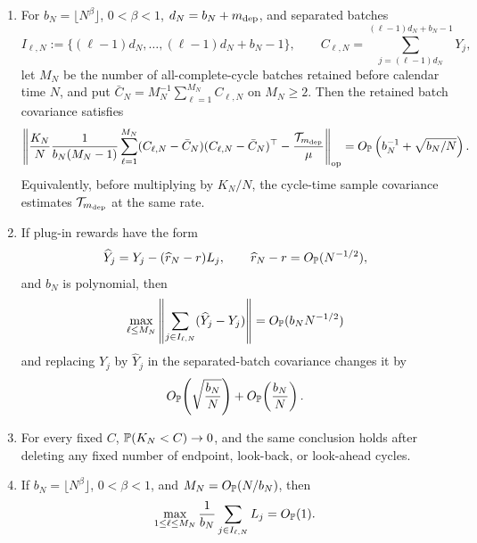 \begin{proposition}
\begin{enumerate}[label=\textup{(\alph*)},leftmargin=2.4em,itemsep=0.25em]
\item For \(b_N=\lfloor N^\beta\rfloor\), \(0<\beta<1\),
\(d_N=b_N+m_{\rm dep}\), and separated batches
\[
I_{\ell,N}:=\{(\ell-1)d_N,\ldots,(\ell-1)d_N+b_N-1\},
\qquad
C_{\ell,N}=\sum_{j=(\ell-1)d_N}^{(\ell-1)d_N+b_N-1}Y_j ,
\]
let \(M_N\) be the number of all-complete-cycle batches retained before
calendar time \(N\), and put
\(\bar C_N=M_N^{-1}\sum_{\ell=1}^{M_N}C_{\ell,N}\) on \(M_N\ge2\).  Then the
retained batch covariance satisfies
\begin{equation}\label{eq:separated-batch-covariance-estimator-rate-main}
\left\|
\frac{K_N}{N}\frac1{b_N(M_N-1)}
\sum_{\ell=1}^{M_N}(C_{\ell,N}-\bar C_N)(C_{\ell,N}-\bar C_N)^\top
-\frac{\mathcal T_{m_{\rm dep}}}{\mu}
\right\|_{\operatorname{op}}
=O_{\mathbb P}\left(b_N^{-1}+\sqrt{b_N/N}\right).
\end{equation}
Equivalently, before multiplying by \(K_N/N\), the cycle-time sample covariance
estimates \(\mathcal T_{m_{\rm dep}}\) at the same rate.

\item If plug-in rewards have the form
\[
\widehat Y_j=Y_j-(\widehat r_N-r)L_j,\qquad
\widehat r_N-r=O_{\mathbb P}(N^{-1/2}),
\]
and \(b_N\) is polynomial, then
\begin{equation}\label{eq:separated-batch-plugin-block-main}
\max_{\ell\le M_N}
\left\|\sum_{j\in I_{\ell,N}}(\widehat Y_j-Y_j)\right\|
=O_{\mathbb P}(b_NN^{-1/2})
\end{equation}
and replacing \(Y_j\) by \(\widehat Y_j\) in the separated-batch covariance
changes it by
\begin{equation}\label{eq:separated-batch-plugin-covariance-main}
O_{\mathbb P}\!\left(\sqrt{\frac{b_N}{N}}\right)
+O_{\mathbb P}\!\left(\frac{b_N}{N}\right).
\end{equation}

\item For every fixed \(C\), \(\mathbb P(K_N<C)\to0\), and the same conclusion holds
after deleting any fixed number of endpoint, look-back, or look-ahead cycles.

\item If \(b_N=\lfloor N^\beta\rfloor\), \(0<\beta<1\), and
\(M_N=O_{\mathbb P}(N/b_N)\), then
\begin{equation}\label{eq:uniform-calendar-block-length-main}
\max_{1\le \ell\le M_N}
\frac1{b_N}\sum_{j\in I_{\ell,N}}L_j
=O_{\mathbb P}(1).
\end{equation}
\end{enumerate}
\end{proposition}


